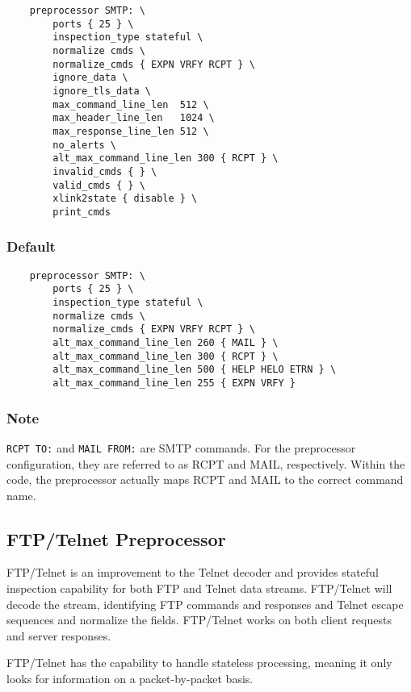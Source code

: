 \documentclass[english]{report}
\begin{document}
\begin{verbatim}
    preprocessor SMTP: \
        ports { 25 } \
        inspection_type stateful \
        normalize cmds \
        normalize_cmds { EXPN VRFY RCPT } \
        ignore_data \
        ignore_tls_data \
        max_command_line_len  512 \
        max_header_line_len   1024 \
        max_response_line_len 512 \
        no_alerts \
        alt_max_command_line_len 300 { RCPT } \
        invalid_cmds { } \
        valid_cmds { } \
        xlink2state { disable } \
        print_cmds
\end{verbatim}

\subsubsection{Default}

\begin{verbatim}
    preprocessor SMTP: \
        ports { 25 } \
        inspection_type stateful \
        normalize cmds \
        normalize_cmds { EXPN VRFY RCPT } \
        alt_max_command_line_len 260 { MAIL } \
        alt_max_command_line_len 300 { RCPT } \
        alt_max_command_line_len 500 { HELP HELO ETRN } \
        alt_max_command_line_len 255 { EXPN VRFY }
\end{verbatim}

\subsubsection{Note}

\texttt{RCPT TO:} and \texttt{MAIL FROM:} are SMTP commands.  For the
preprocessor configuration, they are referred to as RCPT and MAIL,
respectively.  Within the code, the preprocessor actually maps RCPT and MAIL to
the correct command name.

\subsection{FTP/Telnet Preprocessor}
\label{sub:ftptelnet}

FTP/Telnet is an improvement to the Telnet decoder and provides stateful
inspection capability for both FTP and Telnet data streams.  FTP/Telnet will
decode the stream, identifying FTP commands and responses and Telnet escape
sequences and normalize the fields.  FTP/Telnet works on both client requests
and server responses.

FTP/Telnet has the capability to handle stateless processing, meaning it only
looks for information on a packet-by-packet basis.  
\end{document}
